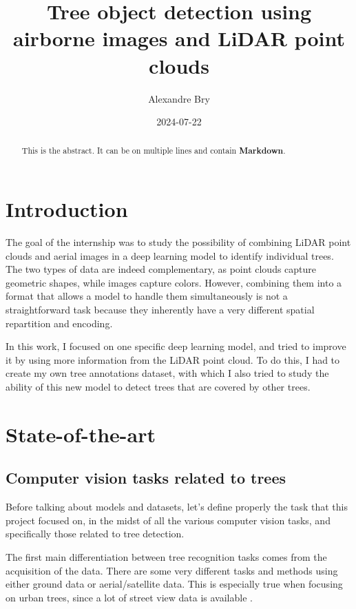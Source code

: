 \documentclass[
  letterpaper,
  DIV=11,
  numbers=noendperiod]{scrartcl}
\title{Tree object detection using airborne images and LiDAR point
clouds}
\author{Alexandre Bry}
\date{2024-07-22}
\renewcommand*\contentsname{Table of contents}
\newcommand\contentsname{Table of contents}
\begin{document}
\maketitle
\begin{abstract}
This is the abstract. It can be on multiple lines and contain
\textbf{Markdown}.
\end{abstract}

\renewcommand*\contentsname{Table of contents}
{
\hypersetup{linkcolor=}
\setcounter{tocdepth}{3}
\tableofcontents
}

\section*{Introduction}\label{introduction}

The goal of the internship was to study the possibility of combining
LiDAR point clouds and aerial images in a deep learning model to
identify individual trees. The two types of data are indeed
complementary, as point clouds capture geometric shapes, while images
capture colors. However, combining them into a format that allows a
model to handle them simultaneously is not a straightforward task
because they inherently have a very different spatial repartition and
encoding.

In this work, I focused on one specific deep learning model, and tried
to improve it by using more information from the LiDAR point cloud. To
do this, I had to create my own tree annotations dataset, with which I
also tried to study the ability of this new model to detect trees that
are covered by other trees.

\section{State-of-the-art}\label{state-of-the-art}

\subsection{Computer vision tasks related to
trees}\label{computer-vision-tasks-related-to-trees}

Before talking about models and datasets, let's define properly the task
that this project focused on, in the midst of all the various computer
vision tasks, and specifically those related to tree detection.

The first main differentiation between tree recognition tasks comes from
the acquisition of the data. There are some very different tasks and
methods using either ground data or aerial/satellite data. This is
especially true when focusing on urban trees, since a lot of street view
data is available \autocite{urban-trees}.
\end{document}
